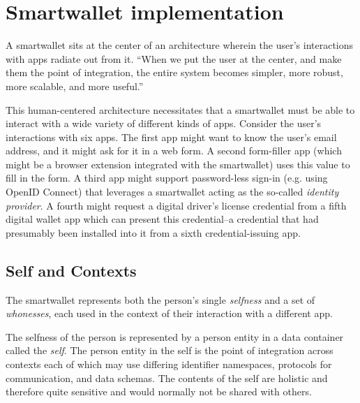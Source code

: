 \documentclass[11pt, oneside]{article}   	%
\begin{document}

\section{Smartwallet implementation} %

A smartwallet sits at the center of an architecture wherein the user's interactions with apps radiate out from it. ``When we put the user at the center, and make them the point of integration, the entire system becomes simpler, more robust, more scalable, and more useful.''\cite{Andrieu2007}

This human-centered architecture necessitates that a smartwallet must be able to interact with a wide variety of different kinds of apps. Consider the user's interactions with six apps. The first app might want to know the user's email address, and it might ask for it in a web form. A second form-filler app (which might be a browser extension integrated with the smartwallet) uses this value to fill in the form. A third app might support password-less sign-in (e.g. using OpenID Connect) that leverages a smartwallet acting as the so-called \emph{identity provider}. A fourth might request a digital driver's license credential from a fifth digital wallet app which can present this credential--a credential that had presumably been installed into it from a sixth credential-issuing app. 

\subsection{Self and Contexts}

The smartwallet represents both the person's single \emph{selfness} and a set of \emph{whonesses}, each used in the context of their interaction with a different app.

The selfness of the person is represented by a person entity in a data container called the \emph{self}. The person entity in the self is the point of integration across contexts each of which may use differing identifier namespaces, protocols for communication, and data schemas. The contents of the self are holistic and therefore quite sensitive and would normally not be shared with others. 
\end{document}
